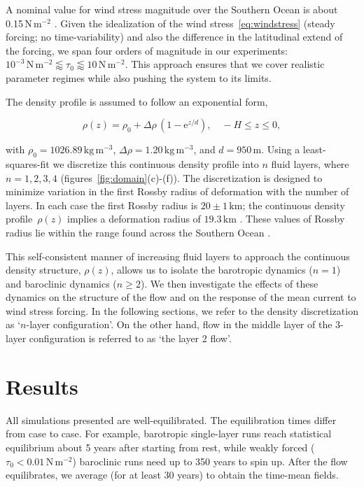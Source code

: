 \documentclass{agujournal2019}
\newcommand{\ee}		{\mathrm{e}}
\newcommand{\Pa}		{\mathrm{N}\,\mathrm{m}^{-2}}
\begin{document}
A nominal value for wind stress magnitude over the Southern Ocean is about 0.15$\,\Pa$ \cite{Risien-Chelton-2008}. Given the idealization of the wind stress~\eqref{eq:windstress} (steady forcing; no time-variability) and also the difference in the latitudinal extend of the forcing, we span four orders of magnitude in our experiments: $10^{-3}\,\Pa\lessapprox \tau_0\lessapprox 10\,\Pa$. This approach ensures that we cover realistic parameter regimes while also pushing the system to its limits.



The density profile is assumed to follow an exponential form,
\begin{linenomath*}
\begin{equation}
\rho(z) = \rho_0+ \Delta\rho \, (1-\ee^{z/d}),\quad -H\le z\le 0,
\end{equation} 
\end{linenomath*} 
with $\rho_0=1026.89\,\mathrm{kg}\,\mathrm{m}^{-3}$, $\Delta\rho=1.20\,\mathrm{kg}\,\mathrm{m}^{-3}$, and $d=950\,\mathrm{m}$.  Using a least-squares-fit we discretize this continuous density profile into $n$ fluid layers, where $n=1,2,3,4$ (figures~\ref{fig:domain}\mbox{(c)-(f)}). 
The discretization is designed to minimize variation in the first Rossby radius of deformation  with the number of layers.
In each case the first Rossby radius is  $20\pm 1\,\mathrm{km}$; the continuous density profile~$\rho(z)$ implies a deformation radius of $19.3\,\mathrm{km}$ \cite{LaCasce-2012}. These values of Rossby radius lie within the range found across the Southern Ocean \cite{Chelton-etal-1998}. 

This self-consistent manner of increasing fluid layers to approach the continuous density structure, $\rho(z)$, allows us to isolate the barotropic dynamics ($n=1$) and baroclinic dynamics ($n\ge 2$). We then  investigate the effects of these dynamics on the structure of the flow and on the response of the mean current to wind stress forcing. In the following sections, we refer to the  density discretization as `$n$-layer configuration'. On the other hand, flow in the middle layer of the 3-layer configuration is referred to as `the layer 2 flow'.


\section{Results}

All simulations presented are well-equilibrated. The equilibration times differ from case to case. For example, barotropic single-layer runs reach statistical equilibrium about 5 years after starting from rest, while weakly forced ($\tau_0<0.01\,\Pa$) baroclinic runs need up to 350 years to spin up. After the flow equilibrates, we average (for at least  30 years) to obtain the time-mean fields.
\end{document}
